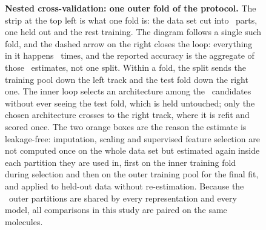 \begin{figure}[!htbp]
{\begin{tikzpicture}
		\end{tikzpicture}%
	}
	\caption{\textbf{Nested cross-validation: one outer fold of the protocol.} The strip at the top left is what one
		fold is: the data set cut into \OuterKFolds\ parts, one held out and the rest training. The diagram follows a
		single such fold, and the dashed arrow on the right closes the loop: everything in it happens
		\TotalOuterFolds\ times, and the reported accuracy is the aggregate of those \TotalOuterFolds\ estimates, not
		one split. Within a fold, the split sends the training pool down the left
		track and the test fold down the right one. The inner loop selects an architecture among the
		\NArchitectureCombos\ candidates without ever seeing the test fold, which is held untouched; only the chosen
		architecture crosses to the right track, where it is refit and scored once. The two orange boxes are the
		reason the estimate is leakage-free: imputation, scaling and supervised feature selection are not computed
		once on the whole data set but estimated again inside each partition they are used in, first on the inner
		training fold during selection and then on the outer training pool for the final fit, and applied to held-out
		data without re-estimation. Because the \TotalOuterFolds\ outer partitions are shared by every representation
		and every model, all comparisons in this study are paired on the same molecules.}
	\label{fig:nested_cv}
\end{figure}
